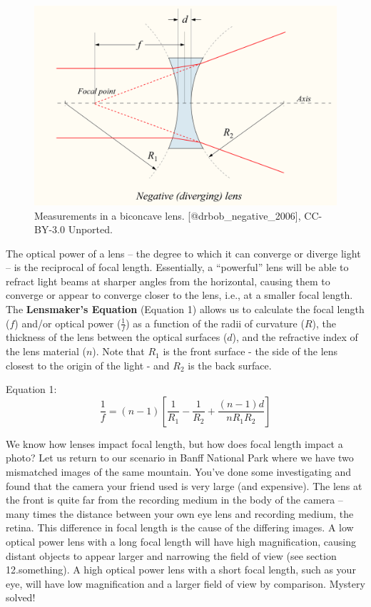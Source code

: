 \documentclass[
]{book}
\begin{document}
\begin{figure}
\includegraphics[width=0.9\linewidth]{images/12-concave_focal_diagram} \caption{Measurements in a biconcave lens. [@drbob_negative_2006], CC-BY-3.0 Unported.}\label{fig:12-concave-focal-diagram}
\end{figure}

The optical power of a lens -- the degree to which it can converge or diverge light -- is the reciprocal of focal length. Essentially, a ``powerful'' lens will be able to refract light beams at sharper angles from the horizontal, causing them to converge or appear to converge closer to the lens, i.e., at a smaller focal length. The \textbf{Lensmaker's Equation} (Equation 1) allows us to calculate the focal length (\(f\)) and/or optical power (\(\frac{1}{f}\)) as a function of the radii of curvature (\(R\)), the thickness of the lens between the optical surfaces (\(d\)), and the refractive index of the lens material (\(n\)). Note that \(R_1\) is the front surface - the side of the lens closest to the origin of the light - and \(R_2\) is the back surface.

Equation 1: \[\frac{1}{f} = (n-1)[\frac{1}{R_1} - \frac{1}{R_2} + \frac{(n-1)d}{nR_1R_2}]\]

We know how lenses impact focal length, but how does focal length impact a photo? Let us return to our scenario in Banff National Park where we have two mismatched images of the same mountain. You've done some investigating and found that the camera your friend used is very large (and expensive). The lens at the front is quite far from the recording medium in the body of the camera -- many times the distance between your own eye lens and recording medium, the retina. This difference in focal length is the cause of the differing images. A low optical power lens with a long focal length will have high magnification, causing distant objects to appear larger and narrowing the field of view (see section 12.something). A high optical power lens with a short focal length, such as your eye, will have low magnification and a larger field of view by comparison. Mystery solved!
\end{document}
